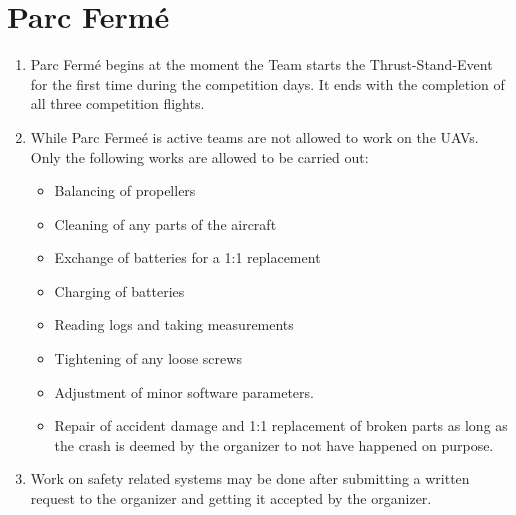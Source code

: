     \section{Parc Fermé}
    \begin{enumerate}
      \item Parc Fermé begins at the moment the Team starts the Thrust-Stand-Event for the first time during the competition days. It ends with the completion of all three competition flights. 
      \item While Parc Fermeé is active teams are not allowed to work on the UAVs. Only the following works are allowed to be carried out: 
      \begin{itemize}
        \item Balancing of propellers
        \item Cleaning of any parts of the aircraft
        \item Exchange of batteries for a 1:1 replacement
        \item Charging of batteries 
        \item Reading logs and taking measurements
        \item Tightening of any loose screws
        \item Adjustment of minor software parameters. 
        \item Repair of accident damage and 1:1 replacement of broken parts as long as the crash is deemed by the organizer to not have happened on purpose. 
      \end{itemize}
      \item Work on safety related systems may be done after submitting a written request to the organizer and getting it accepted by the organizer. 
    \end{enumerate}
    

